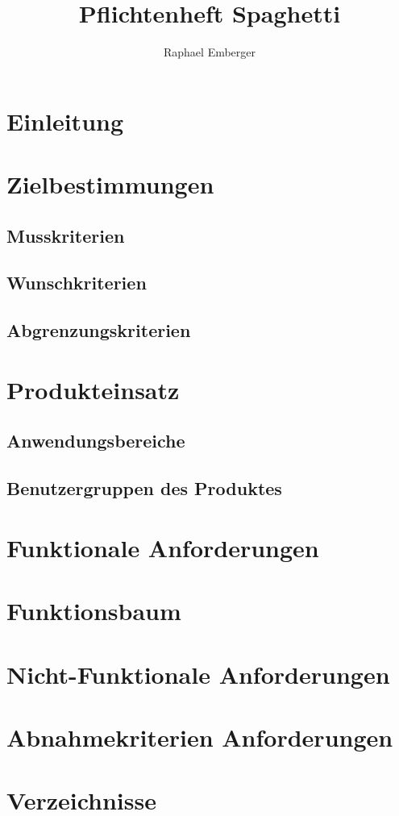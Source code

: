 \documentclass[10pt,a4paper,titlepage,twoside,german]{zhawreprt}
\title{Pflichtenheft Spaghetti}
\author{Raphael Emberger}
\begin{document}
\maketitle
\tableofcontents
\chapter{Einleitung}\label{chp:Introduction}
\chapter{Zielbestimmungen}\label{chp:DefinitionOfGoals}
\section{Musskriterien}\label{sec:MustCriteria}
\section{Wunschkriterien}\label{sec:WishCriteria}
\section{Abgrenzungskriterien}\label{sec:DistinctionCriteria}
\chapter{Produkteinsatz}\label{chp:ProductApplication}
\section{Anwendungsbereiche}\label{sec:FieldOfApplience}
\section{Benutzergruppen des Produktes}\label{sec:TargetAudience}
\chapter{Funktionale Anforderungen}\label{chp:FunctionalRequirements}
\chapter{Funktionsbaum}\label{chp:FunctionTree}
\chapter{Nicht-Funktionale Anforderungen}\label{chp:NonFunctionalRequirements}
\chapter{Abnahmekriterien Anforderungen}\label{chp:TestRequirements}
\chapter{Verzeichnisse}\label{chp:Index}
\printglossary\label{sec:Glossar}
\newpage
\label{sec:Bibliography}
\end{document}
